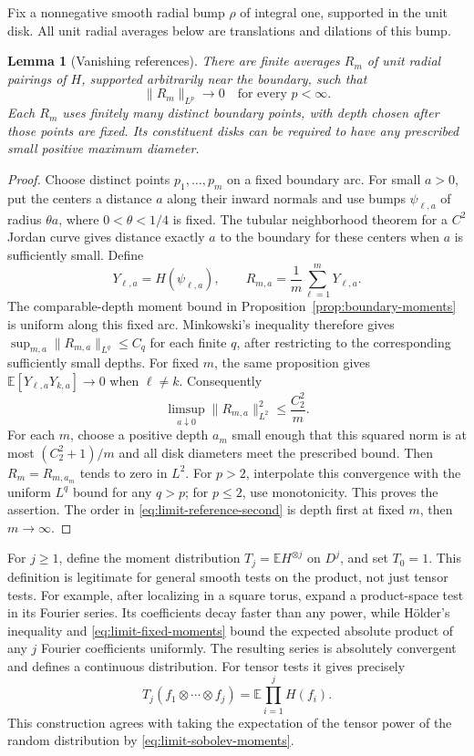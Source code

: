 \documentclass[11pt]{article}
\newtheorem{lemma}[theorem]{Lemma}
\theoremstyle{definition}
\theoremstyle{remark}
\numberwithin{equation}{section}
\begin{document}
Fix a nonnegative smooth radial bump \(\rho\) of integral one,
supported in the unit disk.  All unit radial averages below are
translations and dilations of this bump.

\begin{lemma}[Vanishing references]
\label{limit:references}
There are finite averages \(R_m\) of unit radial pairings of \(H\),
supported arbitrarily near the boundary, such that
\[
       \|R_m\|_{L^p}\longrightarrow0
       \quad\text{for every }p<\infty.
\]
Each \(R_m\) uses finitely many distinct boundary points, with depth
chosen after those points are fixed.  Its constituent disks can be
required to have any prescribed small positive maximum diameter.
\end{lemma}

\begin{proof}
Choose distinct points \(p_1,\ldots,p_m\) on a fixed boundary arc.
For small \(a>0\), put the centers a distance \(a\) along their inward
normals and use bumps \(\psi_{\ell,a}\) of radius \(\theta a\), where
\(0<\theta<1/4\) is fixed.  The tubular neighborhood theorem for a
\(C^2\) Jordan curve gives distance exactly \(a\) to the boundary for
these centers when \(a\) is sufficiently small.  Define
\[
 Y_{\ell,a}=H(\psi_{\ell,a}),\qquad
 R_{m,a}=\frac1m\sum_{\ell=1}^m Y_{\ell,a}.
\]
The comparable-depth moment bound in
Proposition~\ref{prop:boundary-moments} is uniform along this fixed
arc.  Minkowski's inequality therefore gives
\(\sup_{m,a}\|R_{m,a}\|_{L^q}\le C_q\) for each finite \(q\), after
restricting to the corresponding sufficiently small depths.
For fixed \(m\), the same proposition gives
\(\mathbb E[Y_{\ell,a}Y_{k,a}]\to0\) when \(\ell\ne k\).
Consequently
\begin{equation}
  \limsup_{a\downarrow0}\|R_{m,a}\|_{L^2}^2
       \le \frac{C_2^2}{m}.
  \label{eq:limit-reference-second}
\end{equation}
For each \(m\), choose a positive depth \(a_m\) small enough that this
squared norm is at most \((C_2^2+1)/m\) and all disk diameters meet
the prescribed bound.  Then \(R_m=R_{m,a_m}\) tends to zero in
\(L^2\).  For \(p>2\), interpolate this convergence with the uniform
\(L^q\) bound for any \(q>p\); for \(p\le2\), use monotonicity.
This proves the assertion.  The order in
\eqref{eq:limit-reference-second} is depth first at fixed \(m\),
then \(m\to\infty\).
\end{proof}

For \(j\ge1\), define the moment distribution \(T_j=\mathbb E H^{\otimes j}\)
on \(D^j\), and set \(T_0=1\).  This definition is legitimate for
general smooth tests on the product, not just tensor tests.
For example, after localizing in a square torus, expand a product-space
test in its Fourier series.  Its coefficients decay faster than any
power, while H\"older's inequality and
\eqref{eq:limit-fixed-moments} bound the expected absolute product of
any \(j\) Fourier coefficients uniformly.  The resulting series is
absolutely convergent and defines a continuous distribution.
For tensor tests it gives precisely
\[
 T_j(f_1\otimes\cdots\otimes f_j)
       =\mathbb E\prod_{i=1}^j H(f_i).
\]
This construction agrees with taking the expectation of the tensor
power of the random distribution by
\eqref{eq:limit-sobolev-moments}.
\end{document}
